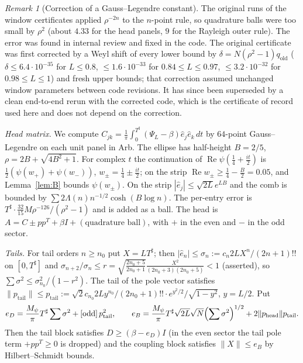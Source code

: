\documentclass[11pt]{amsart}
\newcommand{\od}{\mathrm{odd}}
\newcommand{\re}{\operatorname{Re}}
\newcommand{\Tsh}{T^{\sharp}}
\newcommand{\e}[1]{\cdot 10^{#1}}
\theoremstyle{definition}
\theoremstyle{remark}
\newtheorem{remark}[theorem]{Remark}
\numberwithin{equation}{section}
\begin{document}
\begin{remark}[Correction of a Gauss--Legendre constant]\label{rem:erratum}
The original runs of the window certificates applied $\rho^{-2n}$ to the $n$-point rule, so quadrature balls were too small by $\rho^2$ (about $4.33$ for the head panels, $9$ for the Rayleigh outer rule). The error was found in internal review and fixed in the code. The original certificate was first corrected by a Weyl shift of every lower bound by $\delta=N(\rho^2-1)q_{\mathrm{old}}$ ($\delta\le6.4\e{-35}$ for $L\le0.8$, $\le1.6\e{-33}$ for $0.84\le L\le0.97$, $\le3.2\e{-32}$ for $0.98\le L\le1$) and fresh upper bounds; that correction assumed unchanged window parameters between code revisions. It has since been superseded by a clean end-to-end rerun with the corrected code, which is the certificate of record used here and does not depend on the correction.
\end{remark}

\emph{Head matrix.} We compute $C_{jk}=\frac1\pi\int_0^{\Tsh}(\Psi_L-\beta)\hat e_j\hat e_k\,dt$ by $64$-point Gauss--Legendre on each unit panel in Arb. The ellipse has half-height $B=2/5$, $\rho=2B+\sqrt{4B^2+1}$. For complex $t$ the continuation of $\re\psi(\tfrac14+\tfrac{it}2)$ is $\tfrac12(\psi(w_+)+\psi(w_-))$, $w_\pm=\tfrac14\pm\tfrac{it}2$; on the strip $\re w_\pm\ge\tfrac14-\tfrac B2=0.05$, and Lemma~\ref{lem:B} bounds $\psi(w_\pm)$. On the strip $|\hat e_j|\le\sqrt{2L}e^{LB}$ and the comb is bounded by $\sum2\Lambda(n)n^{-1/2}\cosh(B\log n)$. The per-entry error is $\Tsh\cdot\frac{32}{15}M\rho^{-126}/(\rho^2-1)$ and is added as a ball. The head is $A=C\pm pp^T+\beta I+(\text{quadrature ball})$, with $+$ in the even and $-$ in the odd sector.

\emph{Tails.} For tail orders $n\ge n_0$ put $X=L\Tsh$; then $|\hat e_n|\le\sigma_n:=c_n2LX^n/(2n+1)!!$ on $[0,\Tsh]$ and $\sigma_{n+2}/\sigma_n\le r=\sqrt{\frac{2n_0+5}{2n_0+1}}\frac{X^2}{(2n_0+3)(2n_0+5)}<1$ (asserted), so $\sum\sigma^2\le\sigma_{n_0}^2/(1-r^2)$. The tail of the pole vector satisfies $\|p_{\mathrm{tail}}\|\le p_{\mathrm{tail}}:=\sqrt2c_{n_0}2Ly^{n_0}/(2n_0+1)!!\cdot e^{y^2/2}/\sqrt{1-y^2}$, $y=L/2$. Put
\[
e_D=\frac{M_\psi}\pi\Tsh\sum\sigma^2+[\od]\,p_{\mathrm{tail}}^2,\qquad
e_B=\frac{M_\psi}\pi\Tsh\sqrt{2L}\sqrt N\Bigl(\sum\sigma^2\Bigr)^{1/2}+2\|p_{\mathrm{head}}\|p_{\mathrm{tail}}.
\]
Then the tail block satisfies $D\ge(\beta-e_D)I$ (in the even sector the tail pole term $+pp^T\ge0$ is dropped) and the coupling block satisfies $\|X\|\le e_B$ by Hilbert--Schmidt bounds.
\end{document}

